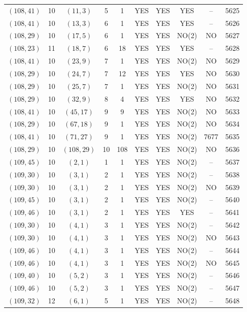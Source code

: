\begin{longtable}{|c|c|c|c|c|c|c|c|c|c|}
$(108, 41)$ & 10 & $(11, 3)$ & 5 & 1 & YES & YES & YES & -- & 5625\\
$(108, 41)$ & 10 & $(13, 3)$ & 6 & 1 & YES & YES & YES & -- & 5626\\
$(108, 29)$ & 10 & $(17, 5)$ & 6 & 1 & YES & YES & NO(2) & NO & 5627\\
$(108, 23)$ & 11 & $(18, 7)$ & 6 & 18 & YES & YES & YES & -- & 5628\\
$(108, 41)$ & 10 & $(23, 9)$ & 7 & 1 & YES & YES & NO(2) & NO & 5629\\
$(108, 29)$ & 10 & $(24, 7)$ & 7 & 12 & YES & YES & YES & NO & 5630\\
$(108, 29)$ & 10 & $(25, 7)$ & 7 & 1 & YES & YES & NO(2) & NO & 5631\\
$(108, 29)$ & 10 & $(32, 9)$ & 8 & 4 & YES & YES & YES & NO & 5632\\
$(108, 41)$ & 10 & $(45, 17)$ & 9 & 9 & YES & YES & NO(2) & NO & 5633\\
$(108, 29)$ & 10 & $(67, 18)$ & 9 & 1 & YES & YES & NO(2) & NO & 5634\\
$(108, 41)$ & 10 & $(71, 27)$ & 9 & 1 & YES & YES & NO(2) & 7677 & 5635\\
$(108, 29)$ & 10 & $(108, 29)$ & 10 & 108 & YES & YES & NO(2) & NO & 5636\\
$(109, 45)$ & 10 & $(2, 1)$ & 1 & 1 & YES & YES & NO(2) & -- & 5637\\
$(109, 30)$ & 10 & $(3, 1)$ & 2 & 1 & YES & YES & NO(2) & -- & 5638\\
$(109, 30)$ & 10 & $(3, 1)$ & 2 & 1 & YES & YES & NO(2) & NO & 5639\\
$(109, 45)$ & 10 & $(3, 1)$ & 2 & 1 & YES & YES & NO(2) & -- & 5640\\
$(109, 46)$ & 10 & $(3, 1)$ & 2 & 1 & YES & YES & YES & -- & 5641\\
$(109, 30)$ & 10 & $(4, 1)$ & 3 & 1 & YES & YES & NO(2) & -- & 5642\\
$(109, 30)$ & 10 & $(4, 1)$ & 3 & 1 & YES & YES & NO(2) & NO & 5643\\
$(109, 46)$ & 10 & $(4, 1)$ & 3 & 1 & YES & YES & NO(2) & -- & 5644\\
$(109, 46)$ & 10 & $(4, 1)$ & 3 & 1 & YES & YES & NO(2) & NO & 5645\\
$(109, 40)$ & 10 & $(5, 2)$ & 3 & 1 & YES & YES & NO(2) & -- & 5646\\
$(109, 46)$ & 10 & $(5, 2)$ & 3 & 1 & YES & YES & NO(2) & -- & 5647\\
$(109, 32)$ & 12 & $(6, 1)$ & 5 & 1 & YES & YES & NO(2) & -- & 5648\\

\end{longtable}
